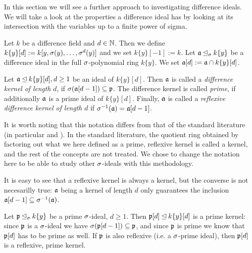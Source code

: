 
In this section we will see a further approach to investigating difference ideals. We will take a look at the properties a difference ideal has by looking at its intersection with the variables up to a finite power of sigma.

\begin{defn}
Let $k$ be a difference field and $d \in \mathbb{N}$. Then we define $k\{y\}[d]:= k[y,\sigma(y),\ldots,\sigma^d(y)]$ and we set $k\{y\}[-1] := k$. Let $\mathfrak{a} \unlhd_{\sigma} k\{y\}$ be a difference ideal in the full $\sigma$-polynomial ring $k\{y\}$. 
We set $\mathfrak{a}[d] := \mathfrak{a} \cap k\{y\}[d]$.
\end{defn}


\begin{defn}
Let $\mathfrak{a} \unlhd k\{y\}[d], d \geq 1$ be an ideal of $k\{y\}[d]$. Then $\mathfrak{a}$ is called a \emph{difference kernel of length $d$}, if $\sigma(\mathfrak{a}[d-1]) \subseteq \mathfrak{p}$. The difference kernel is called \emph{prime}, if additionally $\mathfrak{a}$ is a prime ideal of $k\{y\}[d]$.
Finally, $\mathfrak{a}$ is called a \emph{reflexive difference kernel of length $d$} if $\sigma^{-1}(\mathfrak{a}) = \mathfrak{a}[d-1]$.   
\end{defn}

It is worth noting that this notation differs from that of the standard literature (in particular \cite{cohn} and \cite{levin}). In the standard literature, the quotient ring obtained by factoring out 
what we here defined as a prime, reflexive kernel is called a kernel, and the rest of the concepts are not treated. We chose to change the notation here to be able to study other $\sigma$-ideals with this methodology.

\begin{rem}
It is easy to see that a reflexive kernel is always a kernel, but the converse is not necesarilly true: $\mathfrak{a}$ being a kernel of length $d$ only guarantees the inclusion $\mathfrak{a}[d-1] \subseteq \sigma^{-1}(\mathfrak{a})$.
\end{rem}

\begin{ex}
Let $\mathfrak{p} \unlhd_{\sigma} k\{y\}$ be a prime $\sigma$-ideal, $d \geq 1$. Then $\mathfrak{p}[d] \unlhd k\{y\}[d]$ is a prime kernel: since $\mathfrak{p}$ is a $\sigma$-ideal we have $\sigma(\mathfrak{p}[d-1]) \subseteq \mathfrak{p}$, 
and since $\mathfrak{p}$ is prime we know that $\mathfrak{p}[d]$ has to be prime as well. If $\mathfrak{p}$ is also reflexive (i.e. a $\sigma$-prime ideal), then $\mathfrak{p}[d]$ is a reflexive, prime kernel. 
\end{ex}

